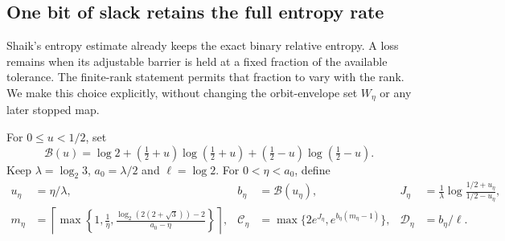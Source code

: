 \subsection{One bit of slack retains the full entropy rate}

Shaik's entropy estimate already keeps the exact binary relative entropy.
A loss remains when its adjustable barrier is held at a fixed fraction
of the available tolerance. The finite-rank statement permits that
fraction to vary with the rank. We make this choice explicitly, without
changing the orbit-envelope set \(W_\eta\) or any later stopped map.

For \(0\le u<1/2\), set
\[
 \mathcal B(u)=\log2+
  (\tfrac12+u)\log(\tfrac12+u)+(\tfrac12-u)\log(\tfrac12-u).
\]
Keep \(\lambda=\log_2 3\), \(a_0=\lambda/2\) and \(\ell=\log2\).
For \(0<\eta<a_0\), define
\begin{align}
 u_\eta&=\eta/\lambda,& b_\eta&=\mathcal B(u_\eta),&
 J_\eta&=\frac1\lambda\log\frac{1/2+u_\eta}{1/2-u_\eta},
 \label{eq:Shaik-full-entropy-constants}\\
 m_\eta&=\left\lceil\max\left\{
  1,\frac1\eta,\frac{\log_2(2(2+\sqrt3))-2}{a_0-\eta}
                         \right\}\right\rceil,&
 \mathcal C_\eta&=\max\{2e^{J_\eta},e^{b_\eta(m_\eta-1)}\},&
 \mathcal D_\eta&=b_\eta/\ell. \nonumber
\end{align}


